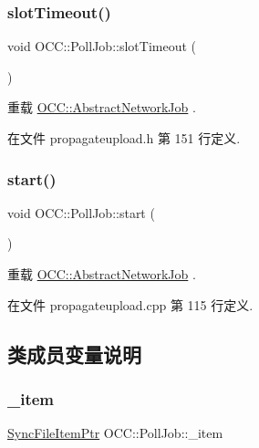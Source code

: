 \subsubsection{\texorpdfstring{slot\+Timeout()}{slotTimeout()}}
{\footnotesize\ttfamily void O\+C\+C\+::\+Poll\+Job\+::slot\+Timeout (\begin{DoxyParamCaption}{ }\end{DoxyParamCaption})\hspace{0.3cm}{\ttfamily [virtual]}}



重载 \hyperlink{class_o_c_c_1_1_abstract_network_job}{O\+C\+C\+::\+Abstract\+Network\+Job} .



在文件 propagateupload.\+h 第 151 行定义.

\mbox{\label{class_o_c_c_1_1_poll_job_a5d11e738f6759ecce57ebeb79cd5c9ac}} 
\subsubsection{\texorpdfstring{start()}{start()}}
{\footnotesize\ttfamily void O\+C\+C\+::\+Poll\+Job\+::start (\begin{DoxyParamCaption}{ }\end{DoxyParamCaption})\hspace{0.3cm}{\ttfamily [virtual]}}



重载 \hyperlink{class_o_c_c_1_1_abstract_network_job_a256f1b6b5d6f6252e83b3602743da64a}{O\+C\+C\+::\+Abstract\+Network\+Job} .



在文件 propagateupload.\+cpp 第 115 行定义.



\subsection{类成员变量说明}
\mbox{\label{class_o_c_c_1_1_poll_job_a7b1fed343646c920b2e0508ccc476e4b}} 
\subsubsection{\texorpdfstring{\+\_\+item}{\_item}}
{\footnotesize\ttfamily \hyperlink{namespace_o_c_c_acb6b0db82893659fbd0c98d3c5b8e2b8}{Sync\+File\+Item\+Ptr} O\+C\+C\+::\+Poll\+Job\+::\+\_\+item}



